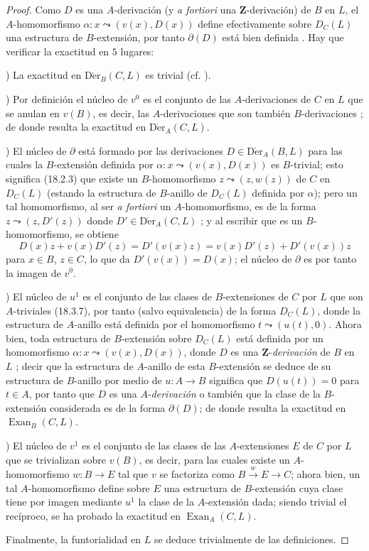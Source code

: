 \begin{proof}
Como $D$ es una $A$-derivación (y \emph{a fortiori} una
$\mathbf{Z}$-derivación) de $B$ en $L$, el $A$-homomorfismo
$\alpha:x\leadsto(v(x),D(x))$ define efectivamente sobre $D_C(L)$ una estructura de
$B$-extensión, por tanto $\partial(D)$ está bien definida . Hay
que verificar la exactitud en $5$ lugares:

\medskip
{})\enspace
La exactitud en $\operatorname{D\acute{e}r}_B(C,L)$ es trivial (cf.
).

\medskip
{})\enspace
Por definición  el núcleo de $v^0$ es el conjunto de las
$A$-derivaciones de $C$ en $L$ que se anulan en $v(B)$, es decir,
las $A$-derivaciones que son también $B$-derivaciones
; de donde resulta la exactitud en $\operatorname{D\acute{e}r}_A(C,L)$.

\medskip
{})\enspace
El núcleo de $\partial$ está formado por las derivaciones
$D\in\operatorname{D\acute{e}r}_A(B,L)$ para las cuales la $B$-extensión definida por
$\alpha:x\leadsto(v(x),D(x))$ es $B$-trivial; esto significa (18.2.3) que
existe un $B$-homomorfismo $z\leadsto(z,w(z))$ de $C$ en $D_C(L)$ (estando la
estructura de $B$-anillo de $D_C(L)$ definida por $\alpha$); pero un tal
homomorfismo, al ser \emph{a fortiori} un $A$-homomorfismo, es de la forma
$z\leadsto(z,D'(z))$ donde $D'\in\operatorname{D\acute{e}r}_A(C,L)$
; y al escribir que es un $B$-homomorfismo, se obtiene
\[
  D(x)z+v(x)D'(z)=D'(v(x)z)=v(x)D'(z)+D'(v(x))z
\]
para $x\in B$, $z\in C$, lo que da $D'(v(x))=D(x)$; el núcleo de
$\partial$ es por tanto la imagen de $v^0$.

\medskip
{})\enspace
El núcleo de $u^1$ es el conjunto de las clases de $B$-extensiones de $C$ por
$L$ que son $A$-triviales (18.3.7), por tanto (salvo equivalencia) de la forma
$D_C(L)$, donde la estructura de $A$-anillo está definida por el homomorfismo
$t\leadsto(u(t),0)$. Ahora bien, toda estructura de $B$-extensión sobre $D_C(L)$ está
definida por un homomorfismo $\alpha:x\leadsto(v(x),D(x))$, donde $D$ es una
$\mathbf{Z}$-\emph{derivación} de $B$ en $L$ ; decir que la
estructura de $A$-anillo de esta $B$-extensión se deduce de su estructura de
$B$-anillo por medio de $u:A\to B$ significa que $D(u(t))=0$ para $t\in A$,
por tanto que $D$ es una $A$-\emph{derivación} o también que la clase de la $B$-extensión
considerada es de la forma $\partial(D)$; de donde resulta la exactitud en
$\operatorname{Exan}_B(C,L)$.

\medskip
{})\enspace
El núcleo de $v^1$ es el conjunto de las clases de las $A$-extensiones $E$ de $C$
por $L$ que se trivializan sobre $v(B)$, es decir, para las cuales existe un
$A$-homomorfismo $w:B\to E$ tal que $v$ se factoriza como
$B\xrightarrow{w}E\to C$; ahora bien, un tal $A$-homomorfismo define sobre $E$ una
estructura de $B$-extensión cuya clase tiene por imagen mediante $u^1$ la clase de
la $A$-extensión dada; siendo trivial el recíproco, se ha probado
la exactitud en $\operatorname{Exan}_A(C,L)$.

Finalmente, la funtorialidad en $L$ se deduce trivialmente de las definiciones.
\end{proof}

